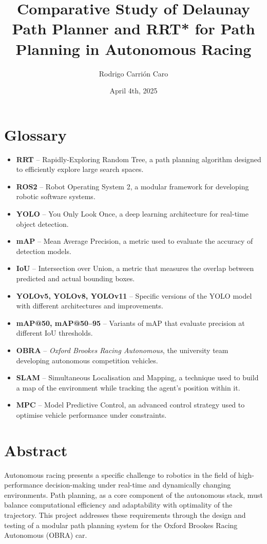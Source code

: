 \documentclass[a4paper,11pt]{report}
\title{\textbf{Comparative Study of Delaunay Path Planner and RRT* for Path Planning in Autonomous Racing}}
\author{Rodrigo Carri\'on Caro}
\date{April 4th, 2025}
\begin{document}
\maketitle
\tableofcontents
\newpage

\chapter*{Glossary}
\begin{itemize}
    \item \textbf{RRT} – Rapidly-Exploring Random Tree, a path planning algorithm designed to efficiently explore large search spaces.
    \item \textbf{ROS2} – Robot Operating System 2, a modular framework for developing robotic software systems.
    \item \textbf{YOLO} – You Only Look Once, a deep learning architecture for real-time object detection.
    \item \textbf{mAP} – Mean Average Precision, a metric used to evaluate the accuracy of detection models.
    \item \textbf{IoU} – Intersection over Union, a metric that measures the overlap between predicted and actual bounding boxes.
    \item \textbf{YOLOv5, YOLOv8, YOLOv11} – Specific versions of the YOLO model with different architectures and improvements.
    \item \textbf{mAP@50, mAP@50–95} – Variants of mAP that evaluate precision at different IoU thresholds.
    \item \textbf{OBRA} – \textit{Oxford Brookes Racing Autonomous}, the university team developing autonomous competition vehicles.
    \item \textbf{SLAM} – Simultaneous Localisation and Mapping, a technique used to build a map of the environment while tracking the agent’s position within it.
    \item \textbf{MPC} – Model Predictive Control, an advanced control strategy used to optimise vehicle performance under constraints.
\end{itemize}

\newpage

\chapter*{Abstract}
Autonomous racing presents a specific challenge to robotics in the field of high-performance 
decision-making under real-time and dynamically changing environments. Path planning, as a core 
component of the autonomous stack, must balance computational efficiency and adaptability with optimality of the trajectory. 
This project addresses these requirements through the design and testing of a modular path planning system for the Oxford Brookes Racing Autonomous (OBRA) car.
\end{document}
